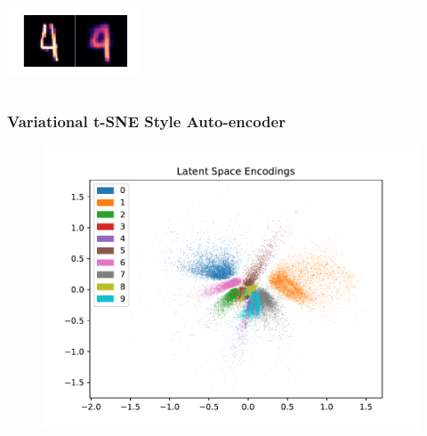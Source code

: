 \documentclass[10pt, usenames, dvipsnames, table]{beamer}
\begin{document}
\begin{frame}
\begin{columns}
    \vspace{2em}
    \includegraphics[width=\linewidth]
    {models/mnist_vaestudent_e300_L2_b64/reconstruction_5}
  \end{columns}
\end{frame}

\begin{frame}
  \frametitle{Variational t-SNE Style Auto-encoder}
  \begin{figure}
    \centering
    \includegraphics[width=\linewidth]
    {models/mnist_vaestudent_e300_L2_b64/encodings}
    \caption{}
    \label{}
  \end{figure}
\end{frame}
\end{document}
